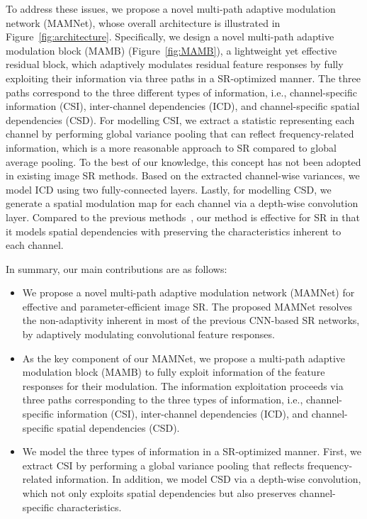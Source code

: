 \documentclass[final,5p,times,twocolumn]{elsarticle}
\begin{document}
To address these issues, we propose a novel multi-path adaptive modulation network (MAMNet), whose overall architecture is illustrated in Figure~\ref{fig:architecture}. 
Specifically, we design a novel multi-path adaptive modulation block (MAMB) (Figure~\ref{fig:MAMB}), a lightweight yet effective residual block, which adaptively modulates residual feature responses by fully exploiting their information via three paths in a SR-optimized manner.
The three paths correspond to the three different types of information, i.e., channel-specific information (CSI), inter-channel dependencies (ICD), and channel-specific spatial dependencies (CSD).
For modelling CSI, we extract a statistic representing each channel by performing global variance pooling that can reflect frequency-related information, which is a more reasonable approach to SR compared to global average pooling.
To the best of our knowledge, this concept has not been adopted in existing image SR methods.
Based on the extracted channel-wise variances, we model ICD using two fully-connected layers.
Lastly, for modelling CSD, we generate a spatial modulation map for each channel via a depth-wise convolution layer.   
Compared to the previous methods~\cite{woo2018cbam,hu2018channel}, our method is effective for SR in that it models spatial dependencies with preserving the characteristics inherent to each channel.


In summary, our main contributions are as follows:
\begin{itemize}
	\item We propose a novel multi-path adaptive modulation network (MAMNet) for effective and parameter-efficient image SR.
	The proposed MAMNet resolves the non-adaptivity inherent in most of the previous CNN-based SR networks, by adaptively modulating convolutional feature responses.
	
	\item As the key component of our MAMNet, we propose a multi-path adaptive modulation block (MAMB) to fully exploit information of the feature responses for their modulation.
	The information exploitation proceeds via three paths corresponding to the three types of information, i.e., channel-specific information (CSI), inter-channel dependencies (ICD), and channel-specific spatial dependencies (CSD).
	
	\item We model the three types of information in a SR-optimized manner.
    First, we extract CSI by performing a global variance pooling that reflects frequency-related information. 
    In addition, we model CSD via a depth-wise convolution, which not only exploits spatial dependencies but also preserves channel-specific characteristics. 
\end{itemize}
\end{document}
